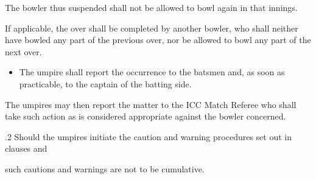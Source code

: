 \documentclass[12pt]{article}
\begin{document}
\vspace{\baselineskip}
\begin{adjustwidth}{1.12in}{0.0in}
{\fontsize{9pt}{10.8pt}\selectfont The bowler thus suspended shall not be allowed to bowl again in that innings.\par}\par

\end{adjustwidth}


\vspace{\baselineskip}
\begin{adjustwidth}{1.12in}{0.11in}
{\fontsize{9pt}{10.8pt}\selectfont If applicable, the over shall be completed by another bowler, who shall neither have bowled any part of the previous over, nor be allowed to bowl any part of the next over.\par}\par

\end{adjustwidth}


\vspace{\baselineskip}
\begin{itemize}
	\item {\fontsize{9pt}{10.8pt}\selectfont The umpire shall report the occurrence to the batsmen and, as soon as practicable, to the captain of the batting side.\par}
\end{itemize}\par


\vspace{\baselineskip}
\begin{adjustwidth}{1.12in}{0.07in}
{\fontsize{9pt}{10.8pt}\selectfont The umpires may then report the matter to the ICC Match Referee who shall take such action as is considered appropriate against the bowler concerned.\par}\par

\end{adjustwidth}


\vspace{\baselineskip}
{\fontsize{9pt}{10.8pt}.2 \tabto{0.49in} Should the umpires initiate the caution and warning procedures set out in clauses and\par}\par


\vspace{\baselineskip}
\begin{adjustwidth}{0.5in}{0.0in}
{\fontsize{9pt}{10.8pt}\selectfont such cautions and warnings are not to be cumulative.\par}\par

\end{adjustwidth}
\end{document}
